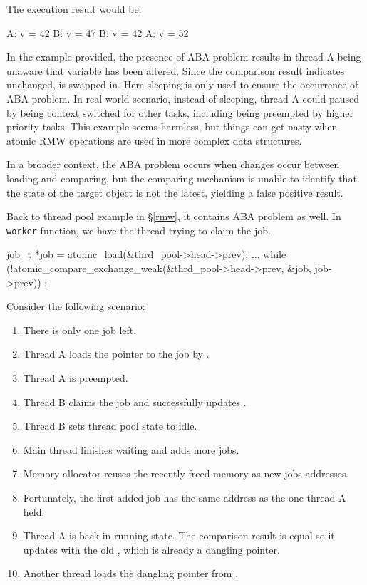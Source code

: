 \documentclass[fontsize=10pt, oneside]{scrartcl}
\newcommand{\monobox}[1]{\mbox{\texttt{#1}}}
\newcommand{\secref}[1]{\hyperref[#1]{\textsc{\S}\ref*{#1}}}
\begin{document}
\inputminted{c}{./examples/simple_aba_example.c}

The execution result would be:

\begin{ccode}
    A: v = 42
    B: v = 47
    B: v = 42
    A: v = 52
\end{ccode}

In the example provided, the presence of ABA problem results in thread A being unaware that variable  has been altered.
Since the comparison result indicates  unchanged,  is swapped in.
Here sleeping is only used to ensure the occurrence of ABA problem.
In real world scenario, instead of sleeping, thread A could paused by being context switched for other tasks, including being preempted by higher priority tasks.
This example seems harmless, but things can get nasty when atomic \textsc{RMW} operations are used in more complex data structures.

In a broader context, the ABA problem occurs when changes occur between loading and comparing, but the comparing mechanism is unable to identify that the state of the target object is not the latest, yielding a false positive result.

Back to thread pool example in \secref{rmw}, it contains ABA problem as well.
In \monobox{worker} function, we have the thread trying to claim the job.

\begin{ccode}
    job_t *job = atomic_load(&thrd_pool->head->prev);
    ...
    while (!atomic_compare_exchange_weak(&thrd_pool->head->prev, &job,
                                           job->prev))
        ;
\end{ccode}

Consider the following scenario:
\begin{enumerate}
    \item There is only one job left.
    \item Thread A loads the pointer to the job by .
    \item Thread A is preempted.
    \item Thread B claims the job and successfully updates .
    \item Thread B sets thread pool state to idle.
    \item Main thread finishes waiting and adds more jobs.
    \item Memory allocator reuses the recently freed memory as new jobs addresses.
    \item Fortunately, the first added job has the same address as the one thread A held.
    \item Thread A is back in running state. The comparison result is equal so it updates  with the old , which is already a dangling pointer.
    \item Another thread loads the dangling pointer from .
\end{enumerate}
\end{document}
